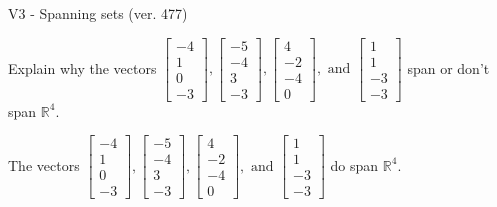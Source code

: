 \begin{exercise}
  \begin{exerciseTitle}V3 - Spanning sets (ver. 477)\end{exerciseTitle}
  \begin{exerciseStatement}
    Explain why the vectors \(\left[\begin{array}{r}
-4 \\
1 \\
0 \\
-3
\end{array}\right] , \left[\begin{array}{r}
-5 \\
-4 \\
3 \\
-3
\end{array}\right] , \left[\begin{array}{r}
4 \\
-2 \\
-4 \\
0
\end{array}\right] , \text{ and } \left[\begin{array}{r}
1 \\
1 \\
-3 \\
-3
\end{array}\right]\) span or don't span \(\mathbb{R}^4\). 
	


  \end{exerciseStatement}
  \begin{exerciseAnswer}
   The vectors \(\left[\begin{array}{r}
-4 \\
1 \\
0 \\
-3
\end{array}\right] , \left[\begin{array}{r}
-5 \\
-4 \\
3 \\
-3
\end{array}\right] , \left[\begin{array}{r}
4 \\
-2 \\
-4 \\
0
\end{array}\right] , \text{ and } \left[\begin{array}{r}
1 \\
1 \\
-3 \\
-3
\end{array}\right]\) 
  	 do  
	span \(\mathbb{R}^4\).
  


  \end{exerciseAnswer}
\end{exercise}